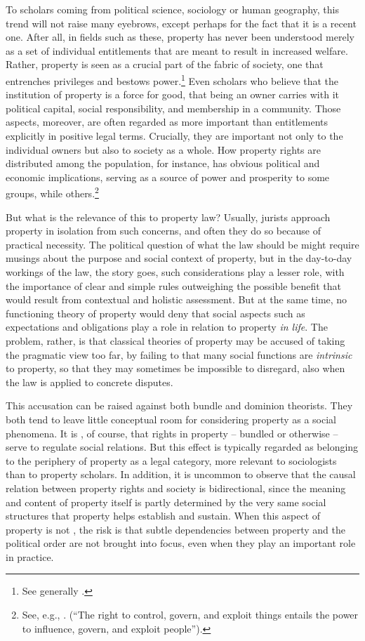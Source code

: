 To scholars coming from political science, sociology or human geography, this trend will not raise many eyebrows, except perhaps for the fact that it is a recent one. After all, in fields such as these, property has never been understood merely as a set of individual entitlements that are meant to result in increased welfare. Rather, property is seen as a crucial part of the fabric of society, one that entrenches privileges and bestows power.\footnote{See generally \cite{carruthers04}.} Even scholars who believe that the institution of property is a force for good,  that being an owner carries with it political capital, social responsibility, and membership in a community. Those aspects, moreover, are often regarded as more important than entitlements explicitly  in positive legal terms. Crucially, they are important not only to the individual owners but also to society as a whole. How property rights are distributed among the population, for instance, has obvious political and economic implications, serving as a source of power and prosperity to some groups, while  others.\footnote{See, e.g., \cite[23]{carruthers04}. (``The right to control, govern, and exploit things entails the power to influence, govern, and exploit people'').}

But what is the relevance of this to property law? Usually, jurists approach property in isolation from such concerns, and often they do so because of practical necessity. The political question of what the law should be might require musings about the purpose and social context of property, but in the day-to-day workings of the law, the story goes, such considerations play a lesser role, with the importance of clear and simple rules outweighing the possible benefit that would result from contextual and holistic assessment. But at the same time, no functioning theory of  property would deny that social aspects such as expectations and obligations play a role in relation to property {\it in life}. The problem, rather, is that classical theories of property may be accused of taking the pragmatic view too far, by failing to  that many social functions are {\it intrinsic} to property, so that they may sometimes be impossible to disregard, also when the law is applied to concrete disputes.

This accusation can be raised against both bundle and dominion theorists. They both tend to leave little conceptual room for considering property as a social phenomena. It is , of course, that rights in property -- bundled or otherwise -- serve to regulate social relations. But this effect is typically regarded as belonging to the periphery of property as a legal category, more relevant to sociologists than to property scholars. In addition, it is uncommon to observe that the causal relation between property rights and society is bidirectional, since the meaning and content of property itself is partly determined by the very same social structures that property helps establish and sustain. When this aspect of property is not , the risk is that subtle dependencies between property and the political order are not brought into focus, even when they play an important role in practice.

